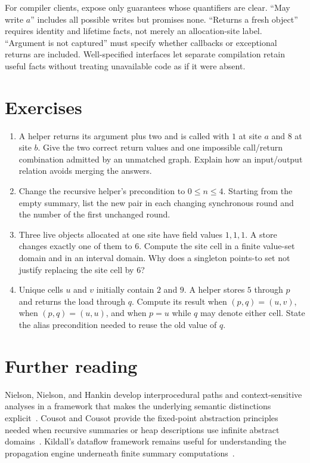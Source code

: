 For compiler clients, expose only guarantees whose quantifiers are clear.
\enquote{May write $a$} includes all possible writes but promises none.
\enquote{Returns a fresh object} requires identity and lifetime facts, not merely an allocation-site label.
\enquote{Argument is not captured} must specify whether callbacks or exceptional returns are included.
Well-specified interfaces let separate compilation retain useful facts without treating unavailable code as if it were absent.

\section{Exercises}
\label{sec:ch44-exercises}

\begin{enumerate}
\item \label{ex:ch44-matching}
A helper returns its argument plus two and is called with $1$ at site $a$ and $8$ at site $b$.
Give the two correct return values and one impossible call/return combination admitted by an unmatched graph.
Explain how an input/output relation avoids merging the answers.
\item \label{ex:ch44-recursion}
Change the recursive helper's precondition to $0\leq n\leq4$.
Starting from the empty summary, list the new pair in each changing synchronous round and the number of the first unchanged round.
\item \label{ex:ch44-weak}
Three live objects allocated at one site have field values $1,1,1$.
A store changes exactly one of them to $6$.
Compute the site cell in a finite value-set domain and in an interval domain.
Why does a singleton points-to set not justify replacing the site cell by $6$?
\item \label{ex:ch44-alias-case}
Unique cells $u$ and $v$ initially contain $2$ and $9$.
A helper stores $5$ through $p$ and returns the load through $q$.
Compute its result when $(p,q)=(u,v)$, when $(p,q)=(u,u)$, and when $p=u$ while $q$ may denote either cell.
State the alias precondition needed to reuse the old value of $q$.
\end{enumerate}

\section{Further reading}
\label{sec:ch44-reading}

Nielson, Nielson, and Hankin develop interprocedural paths and context-sensitive analyses in a framework that makes the underlying semantic distinctions explicit~\cite{nielson-1999-principles}.
Cousot and Cousot provide the fixed-point abstraction principles needed when recursive summaries or heap descriptions use infinite abstract domains~\cite{cousot-1977-abstract}.
Kildall's dataflow framework remains useful for understanding the propagation engine underneath finite summary computations~\cite{kildall-1973-dataflow}.
